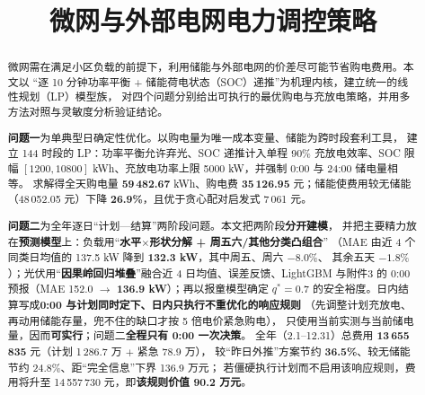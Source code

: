 \documentclass[withoutpreface,bwprint]{cumcmthesis}
\title{微网与外部电网电力调控策略}
\begin{document}
\maketitle

\begin{abstract}
微网需在满足小区负载的前提下\nobreak，利用储能与外部电网的价差尽可能节省购电费用\nobreak。本文以
“逐 10 分钟功率平衡 + 储能荷电状态（SOC\nobreak）递推\nobreak”为机理内核\nobreak，建立统一的线性规划（LP\nobreak）模型族\nobreak，
对四个问题分别给出可执行的最优购电与充放电策略\nobreak，并用多方法对照与灵敏度分析验证结论\nobreak。

\textbf{问题一}为单典型日确定性优化\nobreak。以购电量为唯一成本变量\nobreak、储能为跨时段套利工具\nobreak，
建立 144 时段的 LP\nobreak：功率平衡允许弃光\nobreak、SOC 递推计入单程 90\% 充放电效率\nobreak、SOC 限幅
$[1200,10800]$ kWh\nobreak、充放电功率上限 5000 kW\nobreak，并强制 0:00 与 24:00 储电量相等\nobreak。
求解得全天购电量 \textbf{59\,482.67} kWh\nobreak、购电费 \textbf{35\,126.95} 元\nobreak；储能使费用较无储能
（48\,052.05 元\nobreak）下降 \textbf{26.9\%}\nobreak，且优于贪心配对启发式 7\,061 元\nobreak。

\textbf{问题二}为全年逐日“计划—结算\nobreak”两阶段问题\nobreak。本文把两阶段\textbf{分开建模}\nobreak，
并把主要精力放在\textbf{预测模型}上\nobreak：负载用“\textbf{水平$\times$形状分解 + 周五六/其他分类凸组合}\nobreak”
（MAE 由近 4 个同类日均值的 137.5 kW 降到 \textbf{132.3 kW}\nobreak，其中周五\nobreak、周六 $-8.0\%$\nobreak、
其余五天 $-1.8\%$\nobreak）\nobreak；光伏用“\textbf{因果岭回归堆叠}\nobreak”融合近 4 日均值\nobreak、误差反馈\nobreak、LightGBM
与附件3 的 0:00 预报（MAE 152.0 $\to$ \textbf{136.9 kW}\nobreak）\nobreak；再以报童模型确定
$q^*=0.7$ 的安全裕度\nobreak。日内结算写成\textbf{0:00 与计划同时定下\nobreak、日内只执行不重优化的响应规则}
（先调整计划充放电\nobreak、再动用储能存量\nobreak，兜不住的缺口才按 5 倍电价紧急购电\nobreak）\nobreak，
只使用当前实测与当前储电量\nobreak，因而\textbf{可实行}\nobreak；问题二\textbf{全程只有 0:00 一次决策}\nobreak。
全年（2.1--12.31\nobreak）总费用 \textbf{13\,655\,835} 元（计划 1\,286.7 万 $+$ 紧急 78.9 万\nobreak）\nobreak，
较“昨日外推\nobreak”方案节约 \textbf{36.5\%}\nobreak、较无储能节约 24.8\%\nobreak、距“完全信息\nobreak”下界 136.9 万元\nobreak；
若僵硬执行计划而不启用该响应规则\nobreak，费用将升至 14\,557\,730 元\nobreak，即\textbf{该规则价值 90.2 万元}\nobreak。


\end{abstract}
\end{document}
